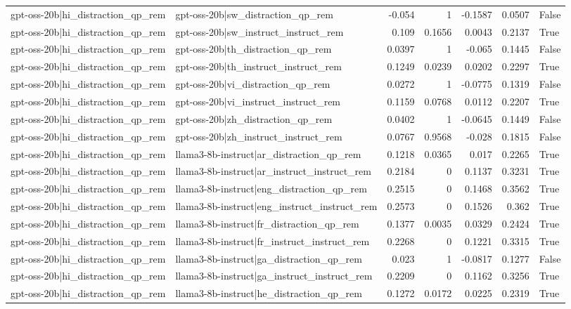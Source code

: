 \begin{table}
\begin{tabular}{l l r r r r l}
gpt-oss-20b|hi_distraction_qp_rem & gpt-oss-20b|sw_distraction_qp_rem & -0.054 & 1 & -0.1587 & 0.0507 & False \\
gpt-oss-20b|hi_distraction_qp_rem & gpt-oss-20b|sw_instruct_instruct_rem & 0.109 & 0.1656 & 0.0043 & 0.2137 & True \\
gpt-oss-20b|hi_distraction_qp_rem & gpt-oss-20b|th_distraction_qp_rem & 0.0397 & 1 & -0.065 & 0.1445 & False \\
gpt-oss-20b|hi_distraction_qp_rem & gpt-oss-20b|th_instruct_instruct_rem & 0.1249 & 0.0239 & 0.0202 & 0.2297 & True \\
gpt-oss-20b|hi_distraction_qp_rem & gpt-oss-20b|vi_distraction_qp_rem & 0.0272 & 1 & -0.0775 & 0.1319 & False \\
gpt-oss-20b|hi_distraction_qp_rem & gpt-oss-20b|vi_instruct_instruct_rem & 0.1159 & 0.0768 & 0.0112 & 0.2207 & True \\
gpt-oss-20b|hi_distraction_qp_rem & gpt-oss-20b|zh_distraction_qp_rem & 0.0402 & 1 & -0.0645 & 0.1449 & False \\
gpt-oss-20b|hi_distraction_qp_rem & gpt-oss-20b|zh_instruct_instruct_rem & 0.0767 & 0.9568 & -0.028 & 0.1815 & False \\
gpt-oss-20b|hi_distraction_qp_rem & llama3-8b-instruct|ar_distraction_qp_rem & 0.1218 & 0.0365 & 0.017 & 0.2265 & True \\
gpt-oss-20b|hi_distraction_qp_rem & llama3-8b-instruct|ar_instruct_instruct_rem & 0.2184 & 0 & 0.1137 & 0.3231 & True \\
gpt-oss-20b|hi_distraction_qp_rem & llama3-8b-instruct|eng_distraction_qp_rem & 0.2515 & 0 & 0.1468 & 0.3562 & True \\
gpt-oss-20b|hi_distraction_qp_rem & llama3-8b-instruct|eng_instruct_instruct_rem & 0.2573 & 0 & 0.1526 & 0.362 & True \\
gpt-oss-20b|hi_distraction_qp_rem & llama3-8b-instruct|fr_distraction_qp_rem & 0.1377 & 0.0035 & 0.0329 & 0.2424 & True \\
gpt-oss-20b|hi_distraction_qp_rem & llama3-8b-instruct|fr_instruct_instruct_rem & 0.2268 & 0 & 0.1221 & 0.3315 & True \\
gpt-oss-20b|hi_distraction_qp_rem & llama3-8b-instruct|ga_distraction_qp_rem & 0.023 & 1 & -0.0817 & 0.1277 & False \\
gpt-oss-20b|hi_distraction_qp_rem & llama3-8b-instruct|ga_instruct_instruct_rem & 0.2209 & 0 & 0.1162 & 0.3256 & True \\
gpt-oss-20b|hi_distraction_qp_rem & llama3-8b-instruct|he_distraction_qp_rem & 0.1272 & 0.0172 & 0.0225 & 0.2319 & True \\

\end{tabular}
\end{table}

